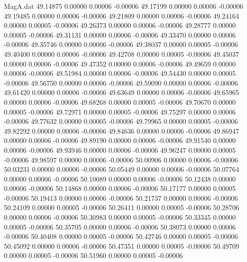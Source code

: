 \begin{filecontents}{MagA.dat}
  49.14875    0.00000    0.00006   -0.00006
  49.17199    0.00000    0.00006   -0.00006
  49.19485    0.00000    0.00006   -0.00006
  49.21809    0.00000    0.00006   -0.00006
  49.24164    0.00000    0.00005   -0.00006
  49.26373    0.00000    0.00006   -0.00006
  49.28777    0.00000    0.00005   -0.00006
  49.31131    0.00000    0.00006   -0.00006
  49.33470    0.00000    0.00006   -0.00006
  49.35746    0.00000    0.00006   -0.00006
  49.38037    0.00000    0.00005   -0.00006
  49.40400    0.00000    0.00006   -0.00006
  49.42708    0.00000    0.00005   -0.00006
  49.45037    0.00000    0.00006   -0.00006
  49.47352    0.00000    0.00006   -0.00006
  49.49659    0.00000    0.00006   -0.00006
  49.51984    0.00000    0.00006   -0.00006
  49.54430    0.00000    0.00005   -0.00006
  49.56750    0.00000    0.00006   -0.00006
  49.59090    0.00000    0.00006   -0.00006
  49.61420    0.00000    0.00006   -0.00006
  49.63649    0.00000    0.00006   -0.00006
  49.65965    0.00000    0.00006   -0.00006
  49.68268    0.00000    0.00005   -0.00006
  49.70670    0.00000    0.00005   -0.00006
  49.72971    0.00000    0.00005   -0.00006
  49.75297    0.00000    0.00006   -0.00006
  49.77632    0.00000    0.00005   -0.00006
  49.79965    0.00000    0.00005   -0.00006
  49.82292    0.00000    0.00006   -0.00006
  49.84636    0.00000    0.00006   -0.00006
  49.86947    0.00000    0.00006   -0.00006
  49.89190    0.00000    0.00006   -0.00006
  49.91540    0.00000    0.00006   -0.00006
  49.93946    0.00000    0.00006   -0.00006
  49.96247    0.00000    0.00005   -0.00006
  49.98597    0.00000    0.00006   -0.00006
  50.00906    0.00000    0.00006   -0.00006
  50.03231    0.00000    0.00006   -0.00006
  50.05449    0.00000    0.00006   -0.00006
  50.07764    0.00000    0.00006   -0.00006
  50.10089    0.00000    0.00006   -0.00006
  50.12438    0.00000    0.00006   -0.00006
  50.14868    0.00000    0.00006   -0.00006
  50.17177    0.00000    0.00005   -0.00006
  50.19413    0.00000    0.00006   -0.00006
  50.21737    0.00000    0.00006   -0.00006
  50.24109    0.00000    0.00005   -0.00006
  50.26411    0.00000    0.00005   -0.00006
  50.28706    0.00000    0.00006   -0.00006
  50.30983    0.00000    0.00005   -0.00006
  50.33345    0.00000    0.00005   -0.00006
  50.35705    0.00000    0.00006   -0.00006
  50.38073    0.00000    0.00006   -0.00006
  50.40408    0.00000    0.00005   -0.00006
  50.42746    0.00000    0.00005   -0.00006
  50.45092    0.00000    0.00006   -0.00006
  50.47351    0.00000    0.00005   -0.00006
  50.49709    0.00000    0.00005   -0.00006
  50.51960    0.00000    0.00005   -0.00006

\end{filecontents}
